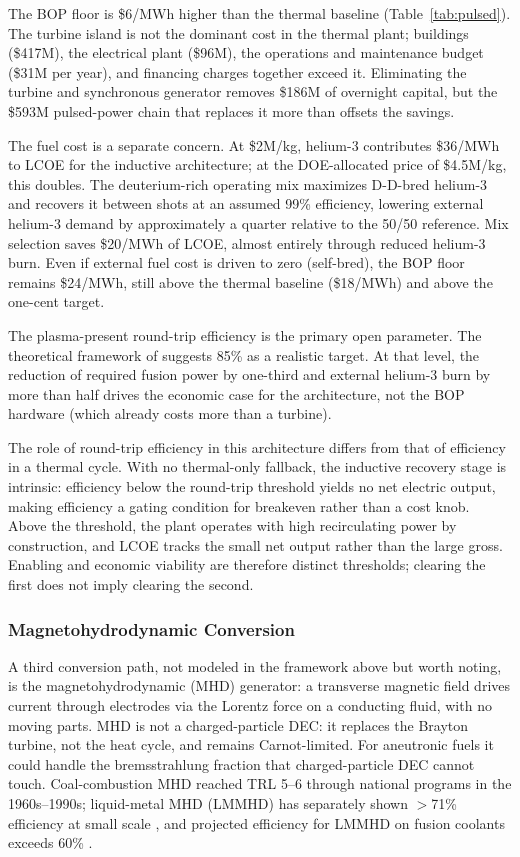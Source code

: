 \documentclass{article}
\begin{document}
The BOP floor is \$6/MWh higher than the thermal baseline
(Table~\ref{tab:pulsed}). The turbine island is not the dominant
cost in the thermal plant; buildings (\$417M), the electrical
plant (\$96M), the operations and maintenance budget
(\$31M per year), and financing charges together exceed it.
Eliminating the turbine and synchronous generator removes
\$186M of overnight capital, but the \$593M
pulsed-power chain that replaces it more than offsets the savings.

The fuel cost is a separate concern. At \$2M/kg, helium-3
contributes \$36/MWh to LCOE for the inductive architecture; at
the DOE-allocated price of \$4.5M/kg, this doubles.
The deuterium-rich operating mix maximizes D-D-bred helium-3 and
recovers it between shots at an assumed 99\% efficiency, lowering
external helium-3 demand by approximately a quarter relative to the
50/50 reference. Mix selection saves \$20/MWh of LCOE,
almost entirely through reduced helium-3 burn. Even if external
fuel cost is driven to zero (self-bred), the BOP floor remains
\$24/MWh, still above the thermal baseline (\$18/MWh) and above
the one-cent target.

The plasma-present round-trip efficiency is the primary open
parameter. The theoretical framework of \citet{Kirtley2024}
suggests 85\% as a realistic target. At that level, the reduction
of required fusion power by one-third and external
helium-3 burn by more than half drives the economic case for the
architecture, not the BOP hardware (which already costs more than
a turbine).

The role of round-trip efficiency in this architecture differs from
that of efficiency in a thermal cycle. With no thermal-only
fallback, the inductive recovery stage is intrinsic: efficiency
below the round-trip threshold yields no net electric output,
making efficiency a gating condition for breakeven rather than a
cost knob. Above the threshold, the plant operates with high
recirculating power by construction, and LCOE tracks the small net
output rather than the large gross. Enabling and economic
viability are therefore distinct thresholds; clearing the first
does not imply clearing the second.

\subsubsection{Magnetohydrodynamic Conversion}
\label{sec:mhd}

A third conversion path, not modeled in the framework above but
worth noting, is the magnetohydrodynamic (MHD) generator: a
transverse magnetic field drives current through electrodes via the
Lorentz force on a conducting fluid, with no moving parts. MHD is
not a charged-particle DEC: it replaces the Brayton turbine, not
the heat cycle, and remains Carnot-limited. For aneutronic fuels it
could handle the bremsstrahlung fraction that charged-particle DEC
cannot touch. Coal-combustion MHD reached TRL 5--6 through national
programs in the 1960s--1990s; liquid-metal MHD (LMMHD) has
separately shown $>$71\% efficiency at small scale
\citep{Fabris1981}, and projected efficiency for LMMHD on fusion
coolants exceeds 60\% \citep{Smolentsev2022}.
\end{document}
